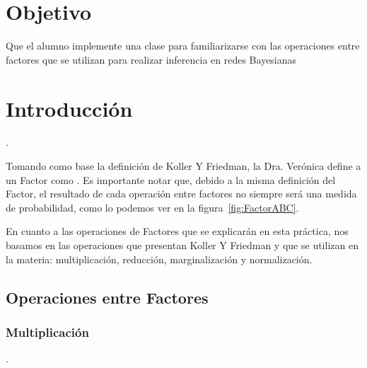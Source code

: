 \section{Objetivo}
Que el alumno implemente una clase  para familiarizarse con las operaciones entre factores que se utilizan para realizar inferencia en redes Bayesianas

\section{Introducción}

 \parencite[104]{KollerFriedman2009}.

Tomando como base la definición de Koller Y Friedman, la Dra. Verónica define a un Factor como . Es importante notar que, debido a la misma definición del Factor, el resultado de cada operación entre factores no siempre será una medida de probabilidad, como lo podemos ver en la figura~\ref{fig:FactorABC}.

En cuanto a las operaciones de Factores que se explicarán en esta práctica, nos basamos en las operaciones que presentan Koller Y Friedman y que se utilizan en la materia: multiplicación, reducción, marginalización y normalización. 

\subsection[Operaciones]{Operaciones entre Factores}

\subsubsection{Multiplicación}
 \parencite[107]{KollerFriedman2009}.

